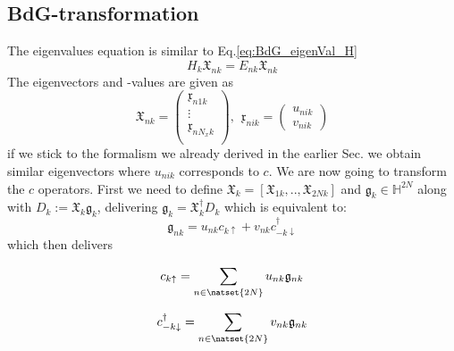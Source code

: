 \documentclass[../main.tex]{subfile}
\begin{document}
\subsection{BdG-transformation}
The eigenvalues equation is similar to Eq.\ref{eq:BdG_eigenVal_H}
\begin{equation}\label{eq:BdG_eigenVal_H_k}
    H_k \mathfrak{X}_{nk} = E_{nk} \mathfrak{X}_{nk}
\end{equation}
The eigenvectors and -values are given as
\begin{equation*}
    \mathfrak{X}_{nk} = \begin{pmatrix}
        \mathfrak{x}_{n1k}\\
        \vdots\\
        \mathfrak{x}_{nN_xk}\\
    \end{pmatrix},~~ \mathfrak{x}_{nik} = \begin{pmatrix}
        u_{nik}\\
        v_{nik}
    \end{pmatrix}
\end{equation*}
if we stick to the formalism we already derived in the earlier Sec.\label{sec:Diagonalization} we obtain similar 
eigenvectors where $u_{nik}$ corresponds to $c$. We are now going to transform the $c$ operators. First we need
to define $\mathfrak{X}_k = [\mathfrak{X}_{1k}, ..,\mathfrak{X}_{2Nk}]$ and $\mathfrak{g}_k\in\mathbb{H}^{2N}$ along with $D_{k} := \mathfrak{X}_k\mathfrak{g}_k$, 
delivering $\mathfrak{g}_k = \mathfrak{X}^{\dagger}_k D_{k}$ which is equivalent to:
\begin{equation}
    \mathfrak{g}_{nk} = u_{nk}c_{k\uparrow} + v_{nk}c^{\dagger}_{-k\downarrow}
\end{equation}
which then delivers 
\begin{center}
    \begin{minipage}{0.4\textwidth}
    \begin{equation}\label{eq:BdG_transf_c}
        c_{k\uparrow} = \sum_{n\in\natset{2N}} u_{nk}\mathfrak{g}_{nk} 
    \end{equation}
    \end{minipage}\hspace{0.05\textwidth}
    \begin{minipage}{0.03\textwidth}
    \end{minipage}
    \begin{minipage}{0.45\textwidth}
        \begin{equation}
        \label{eq:BdG_transf_c_dagg}
            c_{-k\downarrow}^{\dagger} =\sum_{n\in\natset{2N}} v_{nk}\mathfrak{g}_{nk} 
        \end{equation}
    \end{minipage}
    \end{center}
\end{document}
